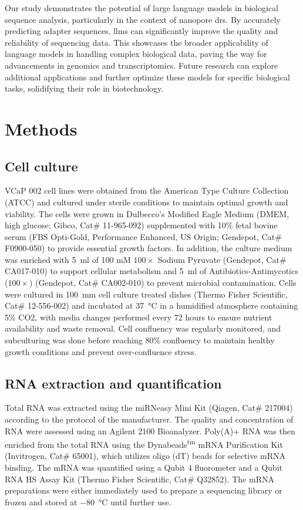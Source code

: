 \documentclass[pdflatex, sn-mathphys-num, lineno]{sn-jnl}%
\theoremstyle{thmstyleone}%
\theoremstyle{thmstyletwo}%
\theoremstyle{thmstylethree}%
\begin{document}
Our study demonstrates the potential of large language models in biological sequence analysis, particularly in the context of nanopore \gls{drs}.
By accurately predicting adapter sequences, \glspl{llm} can significantly improve the quality and reliability of sequencing data.
This showcases the broader applicability of language models in handling complex biological data, paving the way for advancements in genomics and transcriptomics.
Future research can explore additional applications and further optimize these models for specific biological tasks, solidifying their role in biotechnology.


\section{Methods}\label{sec:methods}

\subsection{Cell culture}

VCaP 002 cell lines were obtained from the American Type Culture Collection (ATCC) and cultured under sterile conditions to maintain optimal growth and viability.
The cells were grown in Dulbecco's Modified Eagle Medium (DMEM, high glucose; Gibco, Cat\# 11-965-092) supplemented with 10\% fetal bovine serum (FBS Opti-Gold, Performance Enhanced, US Origin; Gendepot, Cat\# F0900-050) to provide essential growth factors.
In addition, the culture medium was enriched with \SI{5}{\ml} of 100 mM \( 100\times \) Sodium Pyruvate (Gendepot, Cat\# CA017-010) to support cellular metabolism and \SI{5}{\ml} of Antibiotics-Antimycotics (\( 100\times \)) (Gendepot, Cat\# CA002-010) to prevent microbial contamination.
Cells were cultured in \SI{100}{\mm} cell culture treated dishes (Thermo Fisher Scientific, Cat\# 12-556-002) and incubated at \SI{37}{\degreeCelsius} in a humidified atmosphere containing 5\% CO2, with media changes performed every 72 hours to ensure nutrient availability and waste removal.
Cell confluency was regularly monitored, and subculturing was done before reaching 80\% confluency to maintain healthy growth conditions and prevent over-confluence stress.

\subsection{RNA extraction and quantification}

Total RNA was extracted using the miRNeasy Mini Kit (Qiagen, Cat\# 217004) according to the protocol of the manufacturer.
The quality and concentration of RNA were assessed using an Agilent 2100 Bioanalyzer.
Poly(A)+ RNA was then enriched from the total RNA using the Dynabeads\textsuperscript{tm} mRNA Purification Kit (Invitrogen, Cat\# 65001), which utilizes oligo (dT) beads for selective mRNA binding.
The mRNA was quantified using a Qubit 4 fluorometer and a Qubit RNA HS Assay Kit (Thermo Fisher Scientific, Cat\# Q32852).
The mRNA preparations were either immediately used to prepare a sequencing library or frozen and stored at \SI{-80}{\degreeCelsius} until further use.
\end{document}
